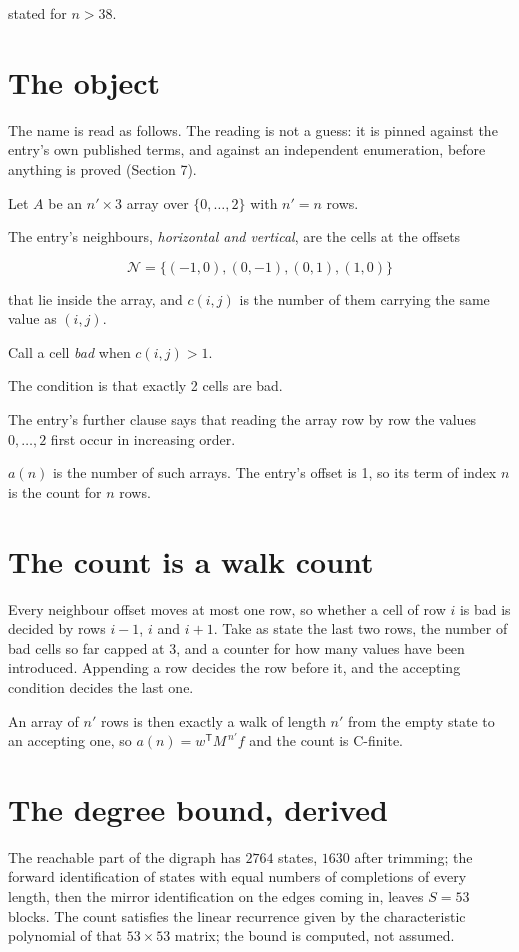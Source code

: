 \documentclass[11pt]{article}
\theoremstyle{definition}
\begin{document}
stated for $n > 38$.

\section{The object}

The name is read as follows. The reading is not a guess: it is pinned against the entry's own published terms, and against an independent enumeration, before anything is proved (Section 7).

Let $A$ be an $n' \times 3$ array over $\{0,\dots,2\}$ with $n' = n$ rows.

The entry's neighbours, {\itshape horizontal and vertical}, are the cells at the offsets

\[\mathcal{N} = \{(-1,0), (0,-1), (0,1), (1,0)\}\]

that lie inside the array, and $c(i,j)$ is the number of them carrying the same value as $(i,j)$.

Call a cell {\itshape bad} when $c(i,j) > 1$.

The condition is that exactly 2 cells are bad.

The entry's further clause says that reading the array row by row the values $0,\dots,2$ first occur in increasing order.

$a(n)$ is the number of such arrays. The entry's offset is 1, so its term of index $n$ is the count for $n$ rows.

\section{The count is a walk count}

Every neighbour offset moves at most one row, so whether a cell of row $i$ is bad is decided by rows $i-1$, $i$ and $i+1$. Take as state the last two rows, the number of bad cells so far capped at 3, and a counter for how many values have been introduced. Appending a row decides the row before it, and the accepting condition decides the last one.

An array of $n'$ rows is then exactly a walk of length $n'$ from the empty state to an accepting one, so $a(n) = w^{\mathsf T}M^{\,n'}f$ and the count is C-finite.

\section{The degree bound, derived}

The reachable part of the digraph has $2764$ states, $1630$ after trimming; the forward identification of states with equal numbers of completions of every length, then the mirror identification on the edges coming in, leaves $S = 53$ blocks. The count satisfies the linear recurrence given by the characteristic polynomial of that $53\times53$ matrix; the bound is computed, not assumed.
\end{document}
